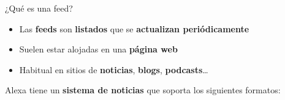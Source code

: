 \documentclass{beamer}
\begin{document}
  \begin{frame}{¿Qué es una feed?}
    {
      \begin{itemize}
        \setlength\itemsep{1.5em}
        \item Las \textbf{feeds} son \textbf{listados} que se \textbf{actualizan periódicamente}
        \item Suelen estar alojadas en una \textbf{página web}
        \item Habitual en sitios de \textbf{noticias}, \textbf{blogs}, \textbf{podcasts}\dots
      \end{itemize}
    }
    {
      Alexa tiene un \textbf{sistema de noticias} que soporta los siguientes formatos:

      \vspace{2em}

}
\end{frame}
\end{document}
